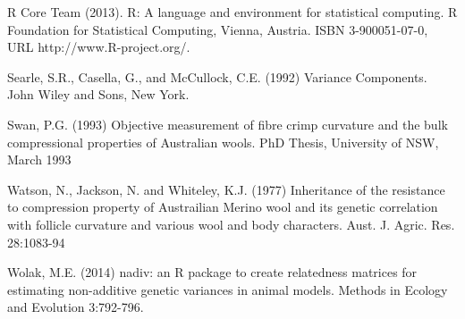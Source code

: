 \documentclass[titlepage]{article}  %
\begin{document}
\begin{thebibliography}{99}
R Core Team (2013). R: A language and environment for statistical
  computing. R Foundation for Statistical Computing, Vienna, Austria.
  ISBN 3-900051-07-0, URL http://www.R-project.org/.

Searle, S.R., Casella, G., and McCullock, C.E. (1992) Variance Components.
    John Wiley and Sons, New York.


Swan, P.G. (1993) Objective measurement of fibre crimp curvature and the bulk compressional properties of Australian wools. PhD Thesis, University of NSW, March 1993 

Watson, N., Jackson, N. and Whiteley, K.J. (1977) Inheritance of the resistance
    to compression property of Austrailian Merino wool and its genetic 
    correlation with follicle curvature and various wool and body 
    characters. Aust. J. Agric. Res. 28:1083-94

Wolak, M.E. (2014) nadiv: an R package to create relatedness matrices for
    estimating non-additive genetic variances in animal models.
    Methods in Ecology and Evolution 3:792-796.

\end{thebibliography}

%
%
%
%
%
%
%
\end{document}
